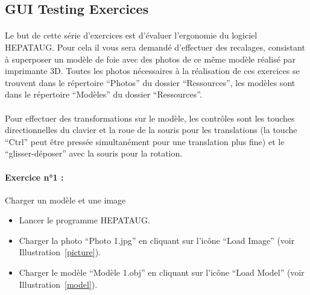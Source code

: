 \documentclass[12pt]{report}
\begin{document}

\begin{appendices}
\setcounter{secnumdepth}{0}

\section{GUI Testing Exercices} \label{secAppendix:A}
\paragraph{}
Le but de cette série d'exercices est d'évaluer l'ergonomie du logiciel HEPATAUG. Pour cela il vous sera demandé d'effectuer des recalages, consistant à superposer un modèle de foie avec des photos de ce même modèle réalisé par imprimante 3D.
Toutes les photos nécessaires à la réalisation de ces exercices se trouvent dans le répertoire ``Photos'' du dossier ``Ressources'', les modèles sont dans le répertoire ``Modèles'' du dossier ``Ressources''.

\paragraph{}
Pour effectuer des transformations sur le modèle, les contrôles sont les touches directionnelles du clavier et la roue de la souris pour les translations (la touche ``Ctrl'' peut être pressée simultanément pour une translation plus fine) et le ``glisser-déposer'' avec la souris pour la rotation.

\paragraph{Exercice n°1 :}Charger un modèle et une image
\begin{itemize}
\item Lancer le programme HEPATAUG.
\item Charger la photo ``Photo 1.jpg'' en cliquant sur l’icône ``Load Image'' (voir Illustration~\ref{picture}).
\item Charger le modèle ``Modèle 1.obj'' en cliquant sur l’icône ``Load Model'' (voir Illustration~\ref{model}).
\end{itemize}


\end{appendices}
\end{document}
